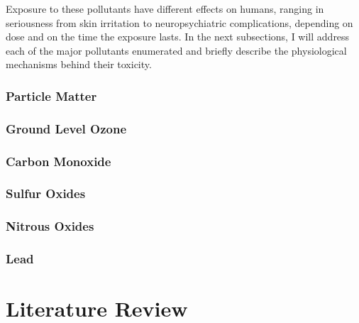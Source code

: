 Exposure to these pollutants have different effects on humans, ranging in
seriousness from skin irritation to neuropsychiatric complications,
depending on dose and on the time the exposure lasts. In the next
subsections, I will address each of the major pollutants enumerated and
briefly describe the physiological mechanisms behind their toxicity.

\subsubsection{Particle Matter}%
\label{ssub:particle_matter}

\subsubsection{Ground Level Ozone}%
\label{ssub:ground_level_ozone}

\subsubsection{Carbon Monoxide}%
\label{ssub:carbon_monoxide}

\subsubsection{Sulfur Oxides}%
\label{ssub:sulfur_oxides}

\subsubsection{Nitrous Oxides}%
\label{ssub:nitrous_oxides}

\subsubsection{Lead}%
\label{ssub:lead}
















\section{Literature Review}%
\label{sec:literature_review}
